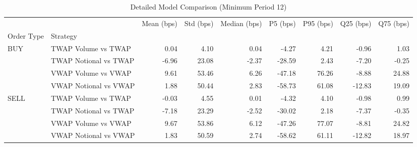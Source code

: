 \begin{table}
\caption{Detailed Model Comparison (Minimum Period 12)}
\label{tab:detailed_min_period_12}
\begin{tabular}{l|l|rrrrrrr}
\toprule
 &  & Mean (bps) & Std (bps) & Median (bps) & P5 (bps) & P95 (bps) & Q25 (bps) & Q75 (bps) \\
Order Type & Strategy &  &  &  &  &  &  &  \\
\midrule
\multirow[t]{4}{*}{BUY} & TWAP Volume vs TWAP & 0.04 & 4.10 & 0.04 & -4.27 & 4.21 & -0.96 & 1.03 \\
 & TWAP Notional vs TWAP & -6.96 & 23.08 & -2.37 & -28.59 & 2.43 & -7.20 & -0.25 \\
 & VWAP Volume vs VWAP & 9.61 & 53.46 & 6.26 & -47.18 & 76.26 & -8.88 & 24.88 \\
 & VWAP Notional vs VWAP & 1.88 & 50.44 & 2.83 & -58.73 & 61.08 & -12.83 & 19.09 \\
\cline{1-9}
\multirow[t]{4}{*}{SELL} & TWAP Volume vs TWAP & -0.03 & 4.55 & 0.01 & -4.32 & 4.10 & -0.98 & 0.99 \\
 & TWAP Notional vs TWAP & -7.18 & 23.29 & -2.52 & -30.02 & 2.18 & -7.37 & -0.35 \\
 & VWAP Volume vs VWAP & 9.67 & 53.86 & 6.12 & -47.26 & 77.07 & -8.81 & 24.82 \\
 & VWAP Notional vs VWAP & 1.83 & 50.59 & 2.74 & -58.62 & 61.11 & -12.82 & 18.97 \\
\cline{1-9}
\bottomrule
\end{tabular}
\end{table}
